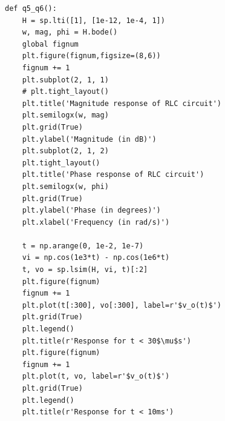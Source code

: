 \documentclass[12pt, a4paper]{article}
\begin{document}
\begin{lstlisting}
def q5_q6():
    H = sp.lti([1], [1e-12, 1e-4, 1])
    w, mag, phi = H.bode()
    global fignum
    plt.figure(fignum,figsize=(8,6))
    fignum += 1
    plt.subplot(2, 1, 1)
    # plt.tight_layout()
    plt.title('Magnitude response of RLC circuit')
    plt.semilogx(w, mag)
    plt.grid(True)
    plt.ylabel('Magnitude (in dB)')
    plt.subplot(2, 1, 2)
    plt.tight_layout()
    plt.title('Phase response of RLC circuit')
    plt.semilogx(w, phi)
    plt.grid(True)
    plt.ylabel('Phase (in degrees)')
    plt.xlabel('Frequency (in rad/s)')

    t = np.arange(0, 1e-2, 1e-7)
    vi = np.cos(1e3*t) - np.cos(1e6*t)
    t, vo = sp.lsim(H, vi, t)[:2]
    plt.figure(fignum)
    fignum += 1
    plt.plot(t[:300], vo[:300], label=r'$v_o(t)$')
    plt.grid(True)
    plt.legend()
    plt.title(r'Response for t < 30$\mu$s')
    plt.figure(fignum)
    fignum += 1
    plt.plot(t, vo, label=r'$v_o(t)$')
    plt.grid(True)
    plt.legend()
    plt.title(r'Response for t < 10ms')
\end{lstlisting}
\end{document}
